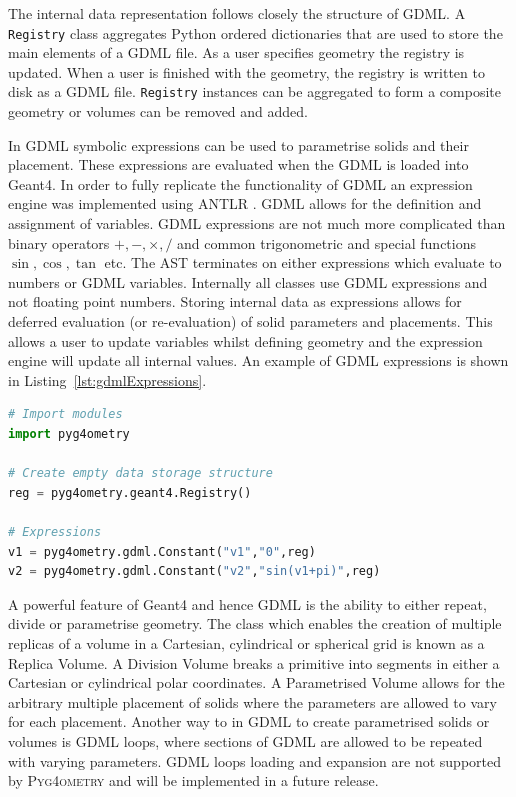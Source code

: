 \documentclass[final,5p,times,twocolumn]{elsarticle}
\newcommand{\PYGEOMETRY}{\textsc{Pyg4ometry}}
\begin{document}
The internal data representation follows closely the structure of GDML. A \verb|Registry| class aggregates Python ordered dictionaries that are  used to store the main 
elements of a GDML file. As a user specifies geometry the registry is updated. When a user is finished with the geometry, the registry is written to disk as a GDML file.
\verb|Registry| instances can be aggregated to form a composite geometry or volumes can be removed and added. 

In GDML symbolic expressions can be used to parametrise solids and their placement. These expressions are evaluated when the GDML is loaded into Geant4. 
In order to fully replicate the functionality of GDML an expression engine was implemented using ANTLR \cite{10.5555/2501720}. GDML allows for the definition 
and assignment of variables. GDML expressions are not much more complicated than binary operators $+, -, \times, /$ and common trigonometric and special functions $\sin, \cos, \tan$ etc. The AST terminates on either expressions which evaluate to numbers or GDML variables. Internally all classes use GDML 
expressions and not floating point numbers. Storing internal data as expressions allows for deferred evaluation (or re-evaluation) of solid parameters and 
placements. This allows a user to update variables whilst defining geometry and the expression engine will update all internal values. An example of GDML expressions is shown in Listing~\ref{lst:gdmlExpressions}.

\begin{lstlisting}[caption={A simple Python script using \PYGEOMETRY{} to create GDML variables.},label={lst:gdmlExpressions}, language=Python]
# Import modules 
import pyg4ometry

# Create empty data storage structure
reg = pyg4ometry.geant4.Registry()

# Expressions 
v1 = pyg4ometry.gdml.Constant("v1","0",reg)
v2 = pyg4ometry.gdml.Constant("v2","sin(v1+pi)",reg)

\end{lstlisting}

 
A powerful feature of Geant4 and hence GDML is the ability to either repeat, divide or parametrise geometry. The class which enables the creation of 
multiple replicas of a volume in a Cartesian, cylindrical or spherical grid is known as a Replica Volume. A Division Volume breaks a primitive into segments 
in either a Cartesian or cylindrical polar coordinates. A Parametrised Volume allows for the arbitrary multiple placement of solids where the parameters are 
allowed to vary for each placement.  Another way to in GDML to create parametrised solids or volumes is GDML loops, where sections of GDML are allowed 
to be repeated with varying parameters. GDML loops loading and expansion are not supported by \PYGEOMETRY{} and will be implemented in a 
future release.
  
\end{document}
